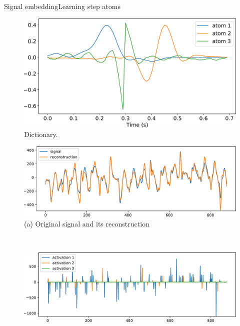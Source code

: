 \documentclass[8pt,t,aspectratio=1610]{beamer}
\newcommand{\ratio}{0.5}
\begin{document}
\begin{frame}{Signal embedding}{Learning step atoms}
\begin{minipage}[t]{0.45\linewidth}
    \centering
    \begin{figure}
    \includegraphics[width=0.85\linewidth]{dictionary.pdf}
    \caption{Dictionary.}
    \end{figure}
\end{minipage}
\begin{minipage}[t]{0.54\linewidth}
    \pause
    \begin{figure}
        \begin{minipage}{\linewidth}
            \centering
            \includegraphics[trim= 0 0 0 0, width=\ratio\linewidth, clip]{signal_walk_young_female_csc_1.pdf}\\
            {\small (a)\; Original signal and its reconstruction}
        \end{minipage}\\
        \begin{minipage}{\linewidth}
            \centering
            \includegraphics[trim= 0 0 0 0, width=\ratio\linewidth, clip]{signal_walk_young_female_csc_2.pdf}\\

\end{minipage}
\end{figure}
\end{minipage}
\end{frame}
\end{document}

